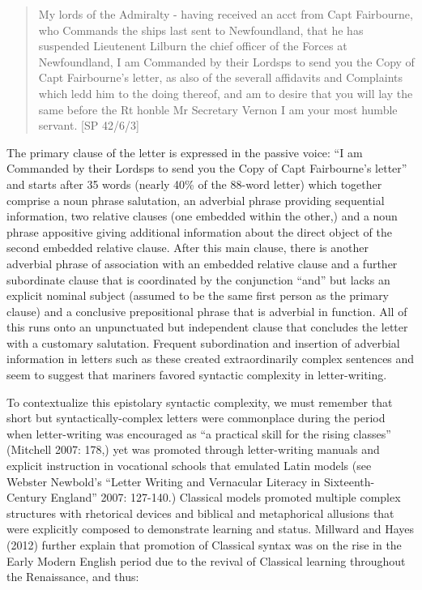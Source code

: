\begin{quotation}
My lords of the Admiralty - having received an acct from Capt Fairbourne, who Commands the ships last sent to Newfoundland, that he has suspended Lieutenent Lilburn the chief officer of the Forces at Newfoundland, I am Commanded by their Lordsps to send you the Copy of Capt Fairbourne’s letter, as also of the severall affidavits and Complaints which ledd him to the doing thereof, and am to desire that you will lay the same before the Rt honble Mr Secretary Vernon I am your most humble servant. [SP 42/6/3] 

\end{quotation}
\begin{styleStandard}
The primary clause of the letter is expressed in the passive voice: “I am Commanded by their Lordsps to send you the Copy of Capt Fairbourne’s letter” and starts after 35 words (nearly 40\% of the 88-word letter) which together comprise a noun phrase salutation, an adverbial phrase providing sequential information, two relative clauses (one embedded within the other,) and a noun phrase appositive giving additional information about the direct object of the second embedded relative clause. After this main clause, there is another adverbial phrase of association with an embedded relative clause and a further subordinate clause that is coordinated by the conjunction “and” but lacks an explicit nominal subject (assumed to be the same first person as the primary clause) and a conclusive prepositional phrase that is adverbial in function. All of this runs onto an unpunctuated but independent clause that concludes the letter with a customary salutation. Frequent subordination and insertion of adverbial information in letters such as these created extraordinarily complex sentences and seem to suggest that mariners favored syntactic complexity in letter-writing. \ 
\end{styleStandard}


\begin{styleStandard}
To contextualize this epistolary syntactic complexity, we must remember that short but syntactically-complex letters were commonplace during the period when letter-writing was encouraged as “a practical skill for the rising classes” (Mitchell 2007: 178,) yet was promoted through letter-writing manuals and explicit instruction in vocational schools that emulated Latin models (see Webster Newbold’s “Letter Writing and Vernacular Literacy in Sixteenth-Century England” 2007: 127-140.) Classical models promoted multiple complex structures with rhetorical devices and biblical and metaphorical allusions that were explicitly composed to demonstrate learning and status. Millward and Hayes (2012) further explain that promotion of Classical syntax was on the rise in the Early Modern English period due to the revival of Classical learning throughout the Renaissance, and thus:
\end{styleStandard}


